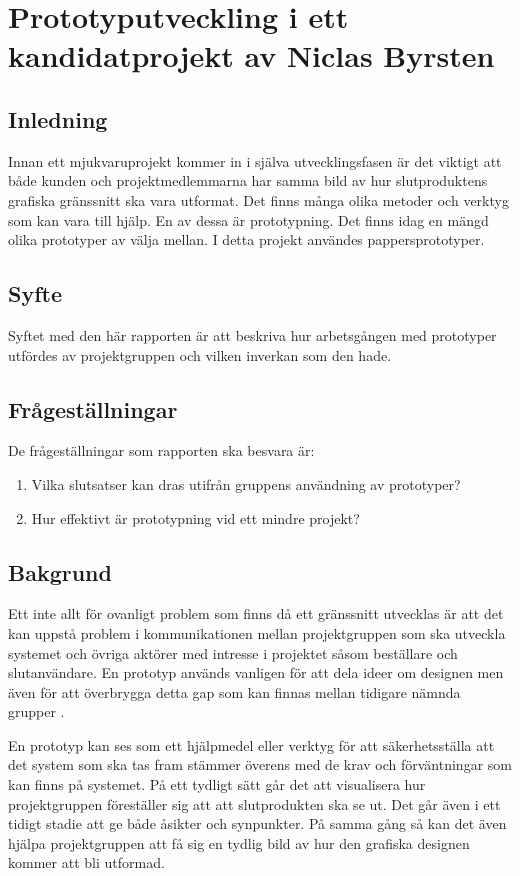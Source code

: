 \chapter{Prototyputveckling i ett kandidatprojekt av Niclas Byrsten}\label{appendix:prototyp}

\section{Inledning}
Innan ett mjukvaruprojekt kommer in i själva utvecklingsfasen är det viktigt att både kunden och projektmedlemmarna har samma bild av hur slutproduktens grafiska gränssnitt ska vara utformat. Det finns många olika metoder och verktyg som kan vara till hjälp. En av dessa är prototypning. Det finns idag en mängd olika prototyper av välja mellan. I detta projekt  användes pappersprototyper.  

\section{Syfte}
Syftet med den här rapporten är att beskriva hur arbetsgången med prototyper utfördes av projektgruppen och vilken inverkan som den hade.
\section{Frågeställningar}
De frågeställningar som rapporten ska besvara är:
\begin{enumerate}
    \item Vilka slutsatser kan dras utifrån gruppens användning av prototyper? 
    \item Hur effektivt är prototypning vid ett mindre projekt?
\end{enumerate}

\section{Bakgrund}
Ett inte allt för ovanligt problem som finns då ett gränssnitt utvecklas är att det kan uppstå problem i kommunikationen mellan projektgruppen som ska utveckla systemet och övriga aktörer med intresse i projektet såsom beställare och slutanvändare. En prototyp används vanligen för att dela ideer om designen men även för att överbrygga detta gap som kan finnas mellan tidigare nämnda grupper \cite{caseStudy}. 

En prototyp kan ses som ett hjälpmedel eller verktyg för att säkerhetsställa att det system som ska tas fram stämmer överens med de krav och förväntningar som kan finns på systemet. På ett tydligt sätt går det att visualisera hur projektgruppen föreställer sig att att slutprodukten ska se ut. Det går även i ett tidigt stadie att ge både åsikter och synpunkter. På samma gång så kan det även hjälpa projektgruppen att få sig en tydlig bild av hur den grafiska designen kommer att bli utformad. 

